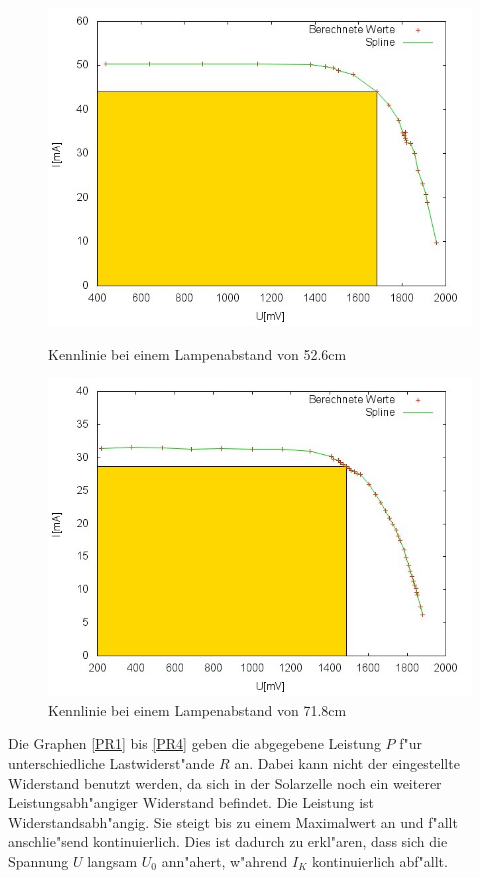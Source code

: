 	\begin{figure}[htbp]
		\centering
		\includegraphics[width = 12cm]{img/526.jpg}
		\caption{Kennlinie bei einem Lampenabstand von 52.6cm}
		\label{UI3}

		\centering
		\includegraphics[width = 12cm]{img/718.jpg}
		\caption{Kennlinie bei einem Lampenabstand von 71.8cm}
		\label{UI4}
	\end{figure}

	Die Graphen \eqref{PR1} bis \eqref{PR4} geben die abgegebene Leistung $P$ f"ur unterschiedliche Lastwiderst"ande $R$ an.
	Dabei kann nicht der eingestellte Widerstand benutzt werden, da sich in der Solarzelle noch ein weiterer Leistungsabh"angiger Widerstand befindet.
	Die Leistung ist Widerstandsabh"angig.
	Sie steigt bis zu einem Maximalwert an und f"allt anschlie"send kontinuierlich.
	Dies ist dadurch zu erkl"aren, dass sich die Spannung $U$ langsam $U_0$ ann"ahert, w"ahrend $I_K$ kontinuierlich abf"allt.\\

